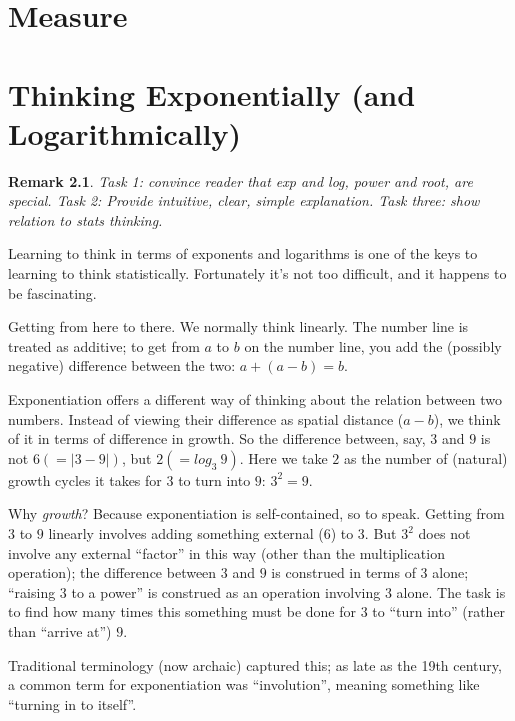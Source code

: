 \documentclass[reqno,12pt]{tufte-book}
\numberwithin{equation}{subsection}
\newtheorem{remark}{Remark}
\begin{document}
\chapter{Measure}


\chapter{Thinking Exponentially (and Logarithmically)}

\begin{remark}
  Task 1: convince reader that exp and log, power and root, are
  special.  Task 2: Provide intuitive, clear, simple explanation.
  Task three: show relation to stats thinking.
\end{remark}

Learning to think in terms of exponents and logarithms is one of the
keys to learning to think statistically.  Fortunately it's not too
difficult, and it happens to be fascinating.

Getting from here to there.  We normally think linearly.  The number
line is treated as additive; to get from $a$ to $b$ on the number
line, you add the (possibly negative) difference between the two: $a +
(a-b) = b$.

Exponentiation offers a different way of thinking about the relation
between two numbers.  Instead of viewing their difference as spatial
distance ($a-b$), we think of it in terms of difference in growth.  So
the difference between, say, $3$ and $9$ is not $6 (= |3-9|)$, but $2
(= log_3\ 9)$.  Here we take $2$ as the number of (natural) growth
cycles it takes for $3$ to turn into $9$: $3^2 = 9$.

Why \textit{growth}?  Because exponentiation is self-contained, so to
speak.  Getting from $3$ to $9$ linearly involves adding something
external ($6$) to $3$.  But $3^2$ does not involve any external
``factor'' in this way (other than the multiplication operation); the
difference between $3$ and $9$ is construed in terms of $3$ alone;
``raising $3$ to a power'' is construed as an operation involving $3$
alone.  The task is to find how many times this something must be done
for $3$ to ``turn into'' (rather than ``arrive at'') $9$.

Traditional terminology (now archaic) captured this; as late as the
19th century, a common term for exponentiation was ``involution'',
meaning something like ``turning in to itself''.
\end{document}
